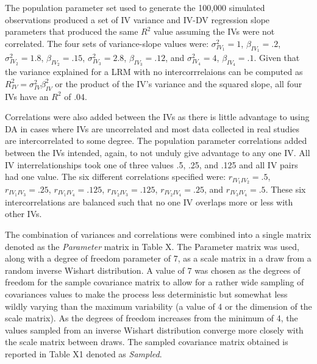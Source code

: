 \documentclass[ShortAfour,times,sageapa]{sagej}
\begin{document}
	The population parameter set used to generate the 100,000 simulated observations produced a set of IV variance and IV-DV regression slope parameters that produced the same $R^2$ value assuming the IVs were not correlated.  The four sets of variance-slope values were: $\sigma^2_{IV_1} = 1$, $\beta_{IV_1} =.2$, $\sigma^2_{IV_2} = 1.8$, $\beta_{IV_2} =.15$, $\sigma^2_{IV_3} = 2.8$, $\beta_{IV_3} =.12$, and $\sigma^2_{IV_4} = 4$, $\beta_{IV_4} =.1$. 
	Given that the variance explained for a LRM with no intercorrrelaions can be computed as $R^2_{IV} = \sigma^2_{IV}\beta^2_{IV}$ or the product of the IV's variance and the squared slope, all four IVs have an $R^2$ of .04.
	
	Correlations were also added between the IVs as there is little advantage to using DA in cases where IVs are uncorrelated and most data collected in real studies are intercorrelated to some degree.  
	The population parameter correlations added between the IVs intended, again, to not unduly give advantage to any one IV.  
	All IV interrelationships took one of three values .5, .25, and .125 and all IV pairs had one value.  The six different correlations specified were: $r_{IV_1 IV_2} = .5$, $r_{IV_1 IV_3} = .25$, $r_{IV_1 IV_4} = .125$, $r_{IV_2 IV_3} = .125$, $r_{IV_2 IV_4} = .25$, and $r_{IV_3 IV_4} = .5$.  
	These six intercorrelations are balanced such that no one IV overlaps more or less with other IVs.

	The combination of variances and correlations were combined into a single matrix denoted as the \emph{Parameter} matrix in Table X.
	The Parameter matrix was used, along with a degree of freedom parameter of 7, as a scale matrix in a draw from a random inverse Wishart distribution.  
	A value of 7 was chosen as the degrees of freedom for the sample covariance matrix to allow for a rather wide sampling of covariances values to make the process less deterministic but somewhat less wildly varying than the maximum variability (a value of 4 or the dimension of the scale matrix).  As the degrees of freedom increases from the minimum of 4, the values sampled from an inverse Wishart distribution converge more closely with the scale matrix between draws.
	The sampled covariance matrix obtained is reported in Table X1 denoted as \emph{Sampled}.
	
\end{document}
